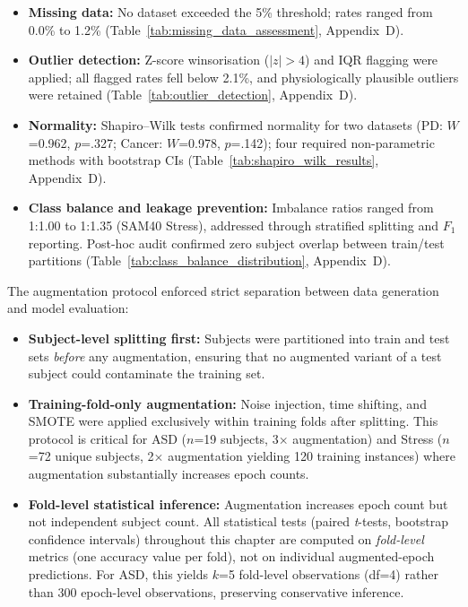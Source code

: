 \begin{itemize}[leftmargin=*, itemsep=3pt]
    \item \textbf{Missing data:} No dataset exceeded the 5\% threshold; rates ranged from 0.0\% to 1.2\% (Table~\ref{tab:missing_data_assessment}, Appendix~D).
    \item \textbf{Outlier detection:} Z-score winsorisation ($|z|>4$) and IQR flagging were applied; all flagged rates fell below 2.1\%, and physiologically plausible outliers were retained (Table~\ref{tab:outlier_detection}, Appendix~D).
    \item \textbf{Normality:} Shapiro--Wilk tests confirmed normality for two datasets (PD: $W$=0.962, $p$=.327; Cancer: $W$=0.978, $p$=.142); four required non-parametric methods with bootstrap CIs (Table~\ref{tab:shapiro_wilk_results}, Appendix~D).
    \item \textbf{Class balance and leakage prevention:} Imbalance ratios ranged from 1:1.00  to 1:1.35 (SAM40 Stress), addressed through stratified splitting and $F_1$ reporting. Post-hoc audit confirmed zero subject overlap between train/test partitions (Table~\ref{tab:class_balance_distribution}, Appendix~D).
\end{itemize}

The augmentation protocol enforced strict separation between data generation and model evaluation:

\begin{itemize}[leftmargin=*, itemsep=3pt]
    \item \textbf{Subject-level splitting first:} Subjects were partitioned into train and test sets \textit{before} any augmentation, ensuring that no augmented variant of a test subject could contaminate the training set.
    \item \textbf{Training-fold-only augmentation:} Noise injection, time shifting, and SMOTE were applied exclusively within training folds after splitting. This protocol is critical for ASD ($n$=19 subjects, 3$\times$ augmentation) and Stress ($n$=72 unique subjects, 2$\times$ augmentation yielding 120 training instances) where augmentation substantially increases epoch counts.
    \item \textbf{Fold-level statistical inference:} Augmentation increases epoch count but not independent subject count. All statistical tests (paired \textit{t}-tests, bootstrap confidence intervals) throughout this chapter are computed on \textit{fold-level} metrics (one accuracy value per fold), not on individual augmented-epoch predictions. For ASD, this yields $k$=5 fold-level observations (df=4) rather than 300 epoch-level observations, preserving conservative inference.
\end{itemize}
\fi


